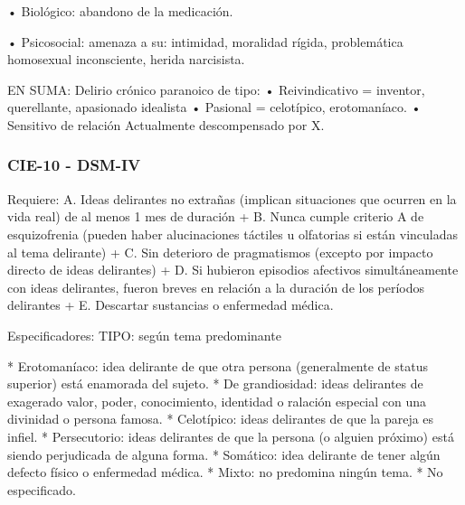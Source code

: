 \documentclass{scrbook}
\begin{document}
• Biológico: abandono de la medicación.

• Psicosocial: amenaza a su: intimidad, moralidad rígida, problemática homosexual inconsciente, herida narcisista.

EN SUMA: Delirio crónico paranoico de tipo: • Reivindicativo = inventor, querellante, apasionado idealista • Pasional = celotípico, erotomaníaco. • Sensitivo de relación Actualmente descompensado por X.

\subsubsection*{CIE-10 - DSM-IV}
Requiere:
A. Ideas delirantes no extrañas (implican situaciones que ocurren en la vida real) de al menos 1 mes de duración +
B. Nunca cumple criterio A de esquizofrenia (pueden haber alucinaciones táctiles u olfatorias si están vinculadas al tema delirante) +
C. Sin deterioro de pragmatismos (excepto por impacto directo de ideas delirantes) +
D. Si hubieron episodios afectivos simultáneamente con ideas delirantes, fueron breves en relación a la duración de los períodos delirantes +
E. Descartar sustancias o enfermedad médica.

Especificadores: TIPO: según tema predominante

* Erotomaníaco: idea delirante de que otra persona (generalmente de status superior) está enamorada del sujeto.
* De grandiosidad: ideas delirantes de exagerado valor, poder, conocimiento, identidad o ralación especial con una divinidad o persona famosa.
* Celotípico: ideas delirantes de que la pareja es infiel.
* Persecutorio: ideas delirantes de que la persona (o alguien próximo) está siendo perjudicada de alguna forma.
* Somático: idea delirante de tener algún defecto físico o enfermedad médica.
* Mixto: no predomina ningún tema.
* No especificado.
\end{document}
